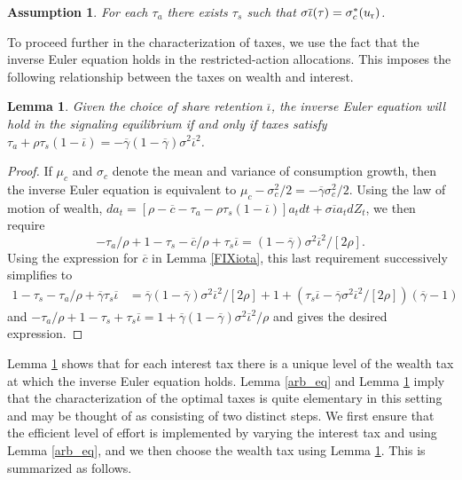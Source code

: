 \documentclass[11pt]{article}
\theoremstyle{plain}
\newtheorem{lemma}[thm]{Lemma}
\newtheorem{assump}{Assumption}[section]
\begin{document}
\begin{assump} \label{imp_assump}
For each $\tau_a$ there exists $\tau_s$ such that $\sigma \overline{\iota}(\tau) = \sigma_c^*(u_{\textnormal{r}})$. 
\end{assump}

To proceed further in the characterization of taxes, we use the fact that the inverse Euler equation holds in the restricted-action allocations. This imposes the following relationship between the taxes on wealth and interest. 

\begin{lemma} \label{IEsig}
Given the choice of share retention $\overline{\iota}$, the inverse Euler equation will hold in the signaling equilibrium if and only if taxes satisfy $\tau_a + \rho\tau_s(1 - \overline{\iota}) = -\overline{\gamma}(1-\overline{\gamma}) \sigma^2 \overline{\iota}^2$.
\end{lemma} 

\begin{proof}
If $\mu_c$ and $\sigma_c$ denote the mean and variance of consumption growth, then the inverse Euler equation is equivalent to $\mu_c - \sigma_c^2/2 = -\overline{\gamma}\sigma_c^2/2$. Using the law of motion of wealth, $da_t  = {\left[\rho - \overline{c} - \tau_a - \rho\tau_s(1 - \overline{\iota})\right]}a_tdt + \sigma \overline{\iota}a_t dZ_t$, we then require
$$
-\tau_a/\rho + 1 - \tau_s - \overline{c}/\rho + \tau_s\overline{\iota} = (1 - \overline{\gamma}) \sigma^2 \overline{\iota}^2/[2\rho].
$$
Using the expression for $\overline{c}$ in Lemma \ref{FIXiota}, this last requirement successively simplifies to
\begin{align*}
1 - \tau_s - \tau_a/\rho + \overline{\gamma}\tau_s\overline{\iota} & = \overline{\gamma}(1-\overline{\gamma}) \sigma^2 \overline{\iota}^2/[2\rho] + 1 + {\left(\tau_s\overline{\iota} - \overline{\gamma}\sigma^2\overline{\iota}^2/[2\rho]\right)}(\overline{\gamma}-1)
\end{align*}
and $-\tau_a/\rho + 1-\tau_s + \tau_s\overline{\iota} = 1 + \overline{\gamma}(1-\overline{\gamma})\sigma^2 \overline{\iota}^2/\rho$ and gives the desired expression. 
\end{proof}

Lemma \ref{IEsig} shows that for each interest tax there is a unique level of the wealth tax at which the inverse Euler equation holds. Lemma \ref{arb_eq} and Lemma \ref{IEsig} imply that the characterization of the optimal taxes is quite elementary in this setting and may be thought of as consisting of two distinct steps. We first ensure that the efficient level of effort is implemented by varying the interest tax and using Lemma \ref{arb_eq}, and we then choose the wealth tax using Lemma \ref{IEsig}. This is summarized as follows.
\end{document}

